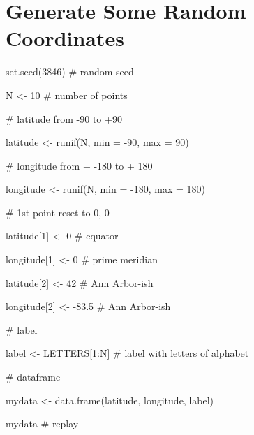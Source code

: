 \documentclass[
  letterpaper,
  DIV=11,
  numbers=noendperiod,
  oneside]{scrreprt}
\newenvironment{Shaded}{\begin{snugshade}}{\end{snugshade}}
\newcommand{\AttributeTok}[1]{\textcolor[rgb]{0.40,0.45,0.13}{#1}}
\newcommand{\CommentTok}[1]{\textcolor[rgb]{0.37,0.37,0.37}{#1}}
\newcommand{\DecValTok}[1]{\textcolor[rgb]{0.68,0.00,0.00}{#1}}
\newcommand{\FloatTok}[1]{\textcolor[rgb]{0.68,0.00,0.00}{#1}}
\newcommand{\FunctionTok}[1]{\textcolor[rgb]{0.28,0.35,0.67}{#1}}
\newcommand{\NormalTok}[1]{\textcolor[rgb]{0.00,0.23,0.31}{#1}}
\newcommand{\OtherTok}[1]{\textcolor[rgb]{0.00,0.23,0.31}{#1}}
\newcommand{\SpecialCharTok}[1]{\textcolor[rgb]{0.37,0.37,0.37}{#1}}
\begin{document}
\section{Generate Some Random
Coordinates}\label{generate-some-random-coordinates}

\begin{Shaded}
\begin{Highlighting}[]
\FunctionTok{set.seed}\NormalTok{(}\DecValTok{3846}\NormalTok{) }\CommentTok{\# random seed}

\NormalTok{N }\OtherTok{\textless{}{-}} \DecValTok{10} \CommentTok{\# number of points}

\CommentTok{\# latitude from {-}90 to +90}

\NormalTok{latitude }\OtherTok{\textless{}{-}} \FunctionTok{runif}\NormalTok{(N, }\AttributeTok{min =} \SpecialCharTok{{-}}\DecValTok{90}\NormalTok{, }\AttributeTok{max =} \DecValTok{90}\NormalTok{) }

\CommentTok{\# longitude from + {-}180 to + 180}

\NormalTok{longitude }\OtherTok{\textless{}{-}} \FunctionTok{runif}\NormalTok{(N, }\AttributeTok{min =} \SpecialCharTok{{-}}\DecValTok{180}\NormalTok{, }\AttributeTok{max =} \DecValTok{180}\NormalTok{) }

\CommentTok{\# 1st point reset to 0, 0}

\NormalTok{latitude[}\DecValTok{1}\NormalTok{] }\OtherTok{\textless{}{-}} \DecValTok{0} \CommentTok{\# equator}

\NormalTok{longitude[}\DecValTok{1}\NormalTok{] }\OtherTok{\textless{}{-}} \DecValTok{0} \CommentTok{\# prime meridian}

\NormalTok{latitude[}\DecValTok{2}\NormalTok{] }\OtherTok{\textless{}{-}} \DecValTok{42} \CommentTok{\# Ann Arbor{-}ish}

\NormalTok{longitude[}\DecValTok{2}\NormalTok{] }\OtherTok{\textless{}{-}} \SpecialCharTok{{-}}\FloatTok{83.5} \CommentTok{\# Ann Arbor{-}ish}

\CommentTok{\# label}

\NormalTok{label }\OtherTok{\textless{}{-}}\NormalTok{ LETTERS[}\DecValTok{1}\SpecialCharTok{:}\NormalTok{N] }\CommentTok{\# label with letters of alphabet}

\CommentTok{\# dataframe}

\NormalTok{mydata }\OtherTok{\textless{}{-}} \FunctionTok{data.frame}\NormalTok{(latitude, longitude, label)}

\NormalTok{mydata }\CommentTok{\# replay}
\end{Highlighting}
\end{Shaded}
\end{document}
